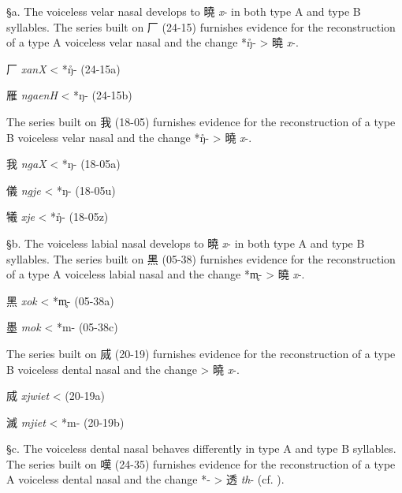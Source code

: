 §a. The voiceless velar nasal develops to 曉  \emph{x}- in both type A
and type B syllables. The series built on ⼚ (24-15) furnishes evidence
for the reconstruction of a type A voiceless velar nasal and the change
*ŋ̊{}- \textgreater{} 曉 \emph{x}-.

\begin{description} \item
⼚  \emph{xanX} \textless{} *ŋ̊{}- (24-15a)
\item
雁  \emph{ngaenH} \textless{} *ŋ- (24-15b)
\end{description}

The series built on 我 (18-05) furnishes evidence for the reconstruction
of a type B voiceless velar nasal and the change *ŋ̊- \textgreater{} 曉
 \emph{x}-.

\begin{description} \item
我  \emph{ngaX} \textless{} *ŋ{}- (18-05a)
\item
儀  \emph{ngje} \textless{} *ŋ- (18-05u)
\item
犧  \emph{xje} \textless{} *ŋ̊- (18-05z)
\end{description}

§b. The voiceless labial nasal develops to 曉  \emph{x}- in both type A
and type B syllables. The series built on 黑 (05-38) furnishes evidence
for the reconstruction of a type A voiceless labial nasal and the change
*m̥{}- \textgreater{} 曉 \emph{x}-.

\begin{description} \item
黑  \emph{xok} \textless{} *m̥{}- (05-38a)
\item
墨 \emph{mok} \textless{} *m{}- (05-38c)
\end{description}

The series built on 烕 (20-19) furnishes evidence for the reconstruction
of a type B voiceless dental nasal and the change {} \textgreater{} 曉
 \emph{x}-.

\begin{description} \item
烕  \emph{xjwiet} \textless{} {} (20-19a)
\item
滅 \emph{mjiet} \textless{} *m- (20-19b)
\end{description}

§c. The voiceless dental nasal behaves differently in type A and type B
syllables. The series built on 嘆 (24-35) furnishes evidence for the
reconstruction of a type A voiceless dental nasal and the change *{}-
\textgreater{} 透  \emph{th}- (cf. 
\cite[193]{Baxter1992}).

